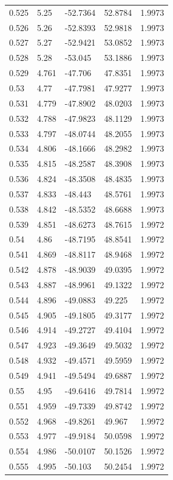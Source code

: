 \begin{tabular}{lllll}
0.525 & 5.25 & -52.7364 & 52.8784 & 1.9973 \\
0.526 & 5.26 & -52.8393 & 52.9818 & 1.9973 \\
0.527 & 5.27 & -52.9421 & 53.0852 & 1.9973 \\
0.528 & 5.28 & -53.045 & 53.1886 & 1.9973 \\
0.529 & 4.761 & -47.706 & 47.8351 & 1.9973 \\
0.53 & 4.77 & -47.7981 & 47.9277 & 1.9973 \\
0.531 & 4.779 & -47.8902 & 48.0203 & 1.9973 \\
0.532 & 4.788 & -47.9823 & 48.1129 & 1.9973 \\
0.533 & 4.797 & -48.0744 & 48.2055 & 1.9973 \\
0.534 & 4.806 & -48.1666 & 48.2982 & 1.9973 \\
0.535 & 4.815 & -48.2587 & 48.3908 & 1.9973 \\
0.536 & 4.824 & -48.3508 & 48.4835 & 1.9973 \\
0.537 & 4.833 & -48.443 & 48.5761 & 1.9973 \\
0.538 & 4.842 & -48.5352 & 48.6688 & 1.9973 \\
0.539 & 4.851 & -48.6273 & 48.7615 & 1.9972 \\
0.54 & 4.86 & -48.7195 & 48.8541 & 1.9972 \\
0.541 & 4.869 & -48.8117 & 48.9468 & 1.9972 \\
0.542 & 4.878 & -48.9039 & 49.0395 & 1.9972 \\
0.543 & 4.887 & -48.9961 & 49.1322 & 1.9972 \\
0.544 & 4.896 & -49.0883 & 49.225 & 1.9972 \\
0.545 & 4.905 & -49.1805 & 49.3177 & 1.9972 \\
0.546 & 4.914 & -49.2727 & 49.4104 & 1.9972 \\
0.547 & 4.923 & -49.3649 & 49.5032 & 1.9972 \\
0.548 & 4.932 & -49.4571 & 49.5959 & 1.9972 \\
0.549 & 4.941 & -49.5494 & 49.6887 & 1.9972 \\
0.55 & 4.95 & -49.6416 & 49.7814 & 1.9972 \\
0.551 & 4.959 & -49.7339 & 49.8742 & 1.9972 \\
0.552 & 4.968 & -49.8261 & 49.967 & 1.9972 \\
0.553 & 4.977 & -49.9184 & 50.0598 & 1.9972 \\
0.554 & 4.986 & -50.0107 & 50.1526 & 1.9972 \\
0.555 & 4.995 & -50.103 & 50.2454 & 1.9972 \\

\end{tabular}
